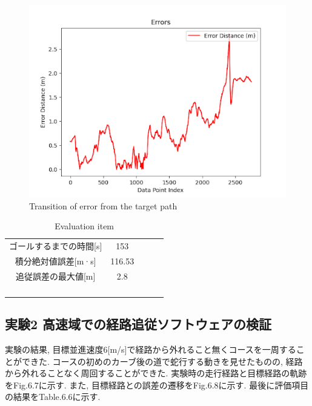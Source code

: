 \begin{figure}[H]
     \centering
    \includegraphics[keepaspectratio, scale=0.7]
         {images/3mserror.png}
    \caption{Transition of error from the target path}
    \label{fig:path}
\end{figure}

\begin{table}[H]
     \centering
     \caption{Evaluation item}
     \begin{tabular}{cclll}
     \multicolumn{1}{c|}{ゴールするまでの時間{[}s{]}}           & 153   &  &  &  \\
     \multicolumn{1}{c|}{積分絶対値誤差{[}m·s{]}} & 116.53 &  &  &  \\
     \multicolumn{1}{c|}{追従誤差の最大値{[}m{]}} & 2.8 &  &  &  \\
                                                &      &  &  &  \\
                                                &      &  &  &  \\
     \multicolumn{1}{l}{}                       &      &  &  &  \\
     \multicolumn{1}{l}{}                       &      &  &  & 
     \end{tabular}
\end{table}

\subsection{実験2   高速域での経路追従ソフトウェアの検証}
実験の結果, 目標並進速度6[m/s]で経路から外れること無くコースを一周することができた.
コースの初めのカーブ後の道で蛇行する動きを見せたものの, 経路から外れることなく周回することができた.
実験時の走行経路と目標経路の軌跡をFig.6.7に示す.
また, 目標経路との誤差の遷移をFig.6.8に示す.
最後に評価項目の結果をTable.6.6に示す.

